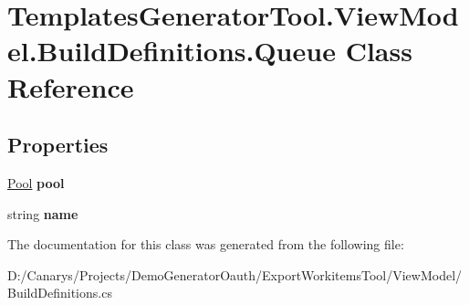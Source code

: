 \hypertarget{class_templates_generator_tool_1_1_view_model_1_1_build_definitions_1_1_queue}{}\section{Templates\+Generator\+Tool.\+View\+Model.\+Build\+Definitions.\+Queue Class Reference}
\label{class_templates_generator_tool_1_1_view_model_1_1_build_definitions_1_1_queue}
\subsection*{Properties}
\begin{DoxyCompactItemize}
\item 
\mbox{\label{class_templates_generator_tool_1_1_view_model_1_1_build_definitions_1_1_queue_a1482f515851248651657aca45a37f63d}} 
\mbox{\hyperlink{class_templates_generator_tool_1_1_view_model_1_1_build_definitions_1_1_pool}{Pool}} {\bfseries pool}
\item 
\mbox{\label{class_templates_generator_tool_1_1_view_model_1_1_build_definitions_1_1_queue_a8a499faeb0debfea3767a73b5c43d493}} 
string {\bfseries name}
\end{DoxyCompactItemize}


The documentation for this class was generated from the following file\+:\begin{DoxyCompactItemize}
\item 
D\+:/\+Canarys/\+Projects/\+Demo\+Generator\+Oauth/\+Export\+Workitems\+Tool/\+View\+Model/Build\+Definitions.\+cs\end{DoxyCompactItemize}
